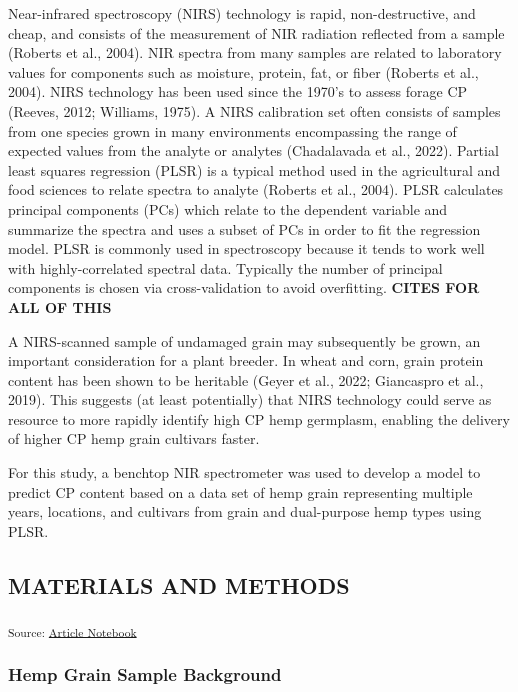 \documentclass[
]{agujournal2019}
\begin{document}
Near-infrared spectroscopy (NIRS) technology is rapid, non-destructive,
and cheap, and consists of the measurement of NIR radiation reflected
from a sample (Roberts et al., 2004). NIR spectra from many samples are
related to laboratory values for components such as moisture, protein,
fat, or fiber (Roberts et al., 2004). NIRS technology has been used
since the 1970's to assess forage CP (Reeves, 2012; Williams, 1975). A
NIRS calibration set often consists of samples from one species grown in
many environments encompassing the range of expected values from the
analyte or analytes (Chadalavada et al., 2022). Partial least squares
regression (PLSR) is a typical method used in the agricultural and food
sciences to relate spectra to analyte (Roberts et al., 2004). PLSR
calculates principal components (PCs) which relate to the dependent
variable and summarize the spectra and uses a subset of PCs in order to
fit the regression model. PLSR is commonly used in spectroscopy because
it tends to work well with highly-correlated spectral data. Typically
the number of principal components is chosen via cross-validation to
avoid overfitting. \textbf{CITES FOR ALL OF THIS}

A NIRS-scanned sample of undamaged grain may subsequently be grown, an
important consideration for a plant breeder. In wheat and corn, grain
protein content has been shown to be heritable (Geyer et al., 2022;
Giancaspro et al., 2019). This suggests (at least potentially) that NIRS
technology could serve as resource to more rapidly identify high CP hemp
germplasm, enabling the delivery of higher CP hemp grain cultivars
faster.

For this study, a benchtop NIR spectrometer was used to develop a model
to predict CP content based on a data set of hemp grain representing
multiple years, locations, and cultivars from grain and dual-purpose
hemp types using PLSR.

\subsection{MATERIALS AND METHODS}\label{materials-and-methods}

\textsubscript{Source:
\href{https://rvcrawford.github.io/glowing-system/index.qmd.html}{Article
Notebook}}

\subsubsection{Hemp Grain Sample
Background}\label{hemp-grain-sample-background}
\end{document}
